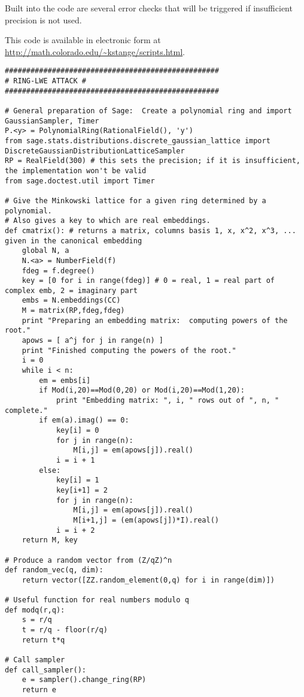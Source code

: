 \documentclass{llncs}
\newcommand{\<}{\langle}
\renewcommand{\>}{\rangle}
\begin{document}
Built into the code are several error checks that will be triggered if insufficient precision is not used.

This code is available in electronic form at \url{http://math.colorado.edu/~kstange/scripts.html}.

\pagebreak

\scriptsize
\begin{verbatim}
##################################################
# RING-LWE ATTACK #
##################################################

# General preparation of Sage:  Create a polynomial ring and import GaussianSampler, Timer
P.<y> = PolynomialRing(RationalField(), 'y')
from sage.stats.distributions.discrete_gaussian_lattice import DiscreteGaussianDistributionLatticeSampler
RP = RealField(300) # this sets the precision; if it is insufficient, the implementation won't be valid
from sage.doctest.util import Timer

# Give the Minkowski lattice for a given ring determined by a polynomial.
# Also gives a key to which are real embeddings.
def cmatrix(): # returns a matrix, columns basis 1, x, x^2, x^3, ... given in the canonical embedding
    global N, a
    N.<a> = NumberField(f)
    fdeg = f.degree()
    key = [0 for i in range(fdeg)] # 0 = real, 1 = real part of complex emb, 2 = imaginary part
    embs = N.embeddings(CC)
    M = matrix(RP,fdeg,fdeg)
    print "Preparing an embedding matrix:  computing powers of the root."
    apows = [ a^j for j in range(n) ]
    print "Finished computing the powers of the root."
    i = 0
    while i < n:
        em = embs[i]
        if Mod(i,20)==Mod(0,20) or Mod(i,20)==Mod(1,20):
            print "Embedding matrix: ", i, " rows out of ", n, " complete."
        if em(a).imag() == 0:
            key[i] = 0
            for j in range(n):
                M[i,j] = em(apows[j]).real()
            i = i + 1
        else:
            key[i] = 1
            key[i+1] = 2
            for j in range(n):
                M[i,j] = em(apows[j]).real()
                M[i+1,j] = (em(apows[j])*I).real()
            i = i + 2
    return M, key

# Produce a random vector from (Z/qZ)^n
def random_vec(q, dim):
    return vector([ZZ.random_element(0,q) for i in range(dim)])

# Useful function for real numbers modulo q
def modq(r,q):
    s = r/q
    t = r/q - floor(r/q)
    return t*q

# Call sampler
def call_sampler():
    e = sampler().change_ring(RP)
    return e


\end{verbatim}
\end{document}
